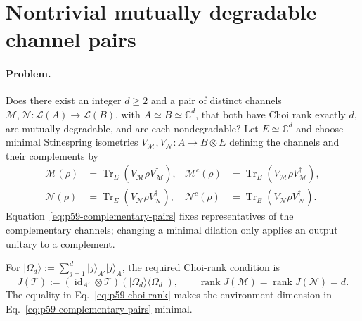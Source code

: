 \section{Nontrivial mutually degradable channel pairs}
\label{sec:problem-59}

\paragraph{Problem.}
Does there exist an integer $d\geq2$ and a pair of distinct channels
$\mathcal M,\mathcal N:\mathcal L(A)\to\mathcal L(B)$, with
$A\simeq B\simeq\mathbb C^d$, that both have Choi rank exactly $d$, are
mutually degradable, and are each nondegradable?  Let
$E\simeq\mathbb C^d$ and choose minimal Stinespring isometries
$V_{\mathcal M},V_{\mathcal N}:A\to B\otimes E$ defining the channels and
their complements by
\begin{equation}
  \begin{aligned}
    \mathcal M(\rho)&=\operatorname{Tr}_E
      (V_{\mathcal M}\rho V_{\mathcal M}^{\dagger}),
    &\mathcal M^c(\rho)&=\operatorname{Tr}_B
      (V_{\mathcal M}\rho V_{\mathcal M}^{\dagger}),\\
    \mathcal N(\rho)&=\operatorname{Tr}_E
      (V_{\mathcal N}\rho V_{\mathcal N}^{\dagger}),
    &\mathcal N^c(\rho)&=\operatorname{Tr}_B
      (V_{\mathcal N}\rho V_{\mathcal N}^{\dagger}).
  \end{aligned}
  \label{eq:p59-complementary-pairs}
\end{equation}
Equation~\eqref{eq:p59-complementary-pairs} fixes representatives of the
complementary channels; changing a minimal dilation only applies an output
unitary to a complement.

For
$\lvert\Omega_d\rangle:=\sum_{j=1}^d\lvert j\rangle_{A'}\lvert j\rangle_A$,
the required Choi-rank condition is
\begin{equation}
  J(\mathcal T):=(\operatorname{id}_{A'}\otimes\mathcal T)
    (\lvert\Omega_d\rangle\!\langle\Omega_d\rvert),
  \qquad
  \operatorname{rank}J(\mathcal M)
   =\operatorname{rank}J(\mathcal N)=d.
  \label{eq:p59-choi-rank}
\end{equation}
The equality in Eq.~\eqref{eq:p59-choi-rank} makes the environment dimension
in Eq.~\eqref{eq:p59-complementary-pairs} minimal.

